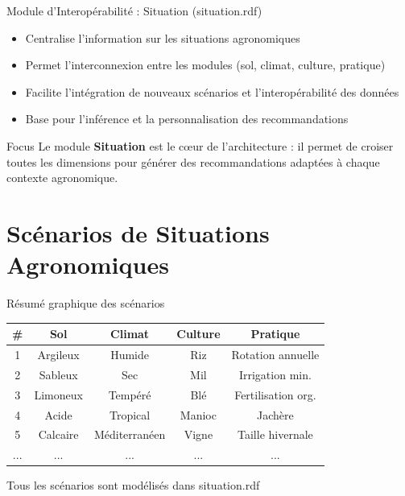 \documentclass{beamer}
\begin{document}
\begin{frame}{Module d'Interopérabilité : Situation (situation.rdf)}
  \begin{itemize}
    \item Centralise l'information sur les situations agronomiques
    \item Permet l'interconnexion entre les modules (sol, climat, culture, pratique)
    \item Facilite l'intégration de nouveaux scénarios et l'interopérabilité des données
    \item Base pour l'inférence et la personnalisation des recommandations
  \end{itemize}
  \pause
  \begin{exampleblock}{Focus}
    Le module \textbf{Situation} est le cœur de l’architecture : il permet de croiser toutes les dimensions pour générer des recommandations adaptées à chaque contexte agronomique.
  \end{exampleblock}
\end{frame}


\section{Scénarios de Situations Agronomiques}

\begin{frame}{Résumé graphique des scénarios}
  \centering
  \begin{tabular}{|c|c|c|c|c|}
    \hline
    \textbf{\#} & \textbf{Sol} & \textbf{Climat} & \textbf{Culture} & \textbf{Pratique} \\
    \hline
    1 & Argileux & Humide & Riz & Rotation annuelle \\
    2 & Sableux & Sec & Mil & Irrigation min. \\
    3 & Limoneux & Tempéré & Blé & Fertilisation org. \\
    4 & Acide & Tropical & Manioc & Jachère \\
    5 & Calcaire & Méditerranéen & Vigne & Taille hivernale \\
    \hline
    ... & ... & ... & ... & ... \\
    \hline
  \end{tabular}
  \vspace{0.3cm}
  \alert{\small{Tous les scénarios sont modélisés dans situation.rdf}}
\end{frame}
\end{document}

